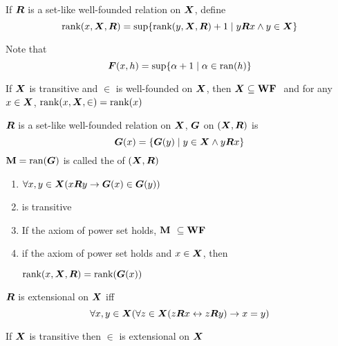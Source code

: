 \documentclass[11pt]{article}
\begin{document}
\begin{definition}[]
If \(\boldsymbol{R}\) is a set-like well-founded relation on \(\boldsymbol{X}\), define 
\begin{equation*}
\text{rank}(x,\boldsymbol{X},\boldsymbol{R})=\sup\{\text{rank}(y,\boldsymbol{X},\boldsymbol{R})+1\mid y\boldsymbol{R} x\wedge y\in\boldsymbol{X}\}
\end{equation*}
\end{definition}

Note that
\begin{equation*}
\boldsymbol{F}(x,h)=\sup\{\alpha+1\mid\alpha\in\mathrm{ran}{(h)}\}
\end{equation*}

\begin{lemma}[$\zfmm$]
If \(\boldsymbol{X}\) is transitive and \(\in\) is well-founded on \(\boldsymbol{X}\), then
\(\boldsymbol{X}\subseteq\textbf{WF }\) and for any \(x\in\boldsymbol{X}\), \(\text{rank}(x,\boldsymbol{X},\in)=\text{rank}(x)\)
\end{lemma}

\begin{definition}[]
\(\boldsymbol{R}\) is a set-like well-founded relation on \(\boldsymbol{X}\), 
\(\boldsymbol{G}\) on \((\boldsymbol{X},\boldsymbol{R})\) is 
\begin{equation*}
\boldsymbol{G}(x)=\{\boldsymbol{G}(y)\mid y\in\boldsymbol{X}\wedge y\boldsymbol{R} x\}
\end{equation*}
\(\textbf{M}=\mathrm{ran}{(\boldsymbol{G})}\) is called the  of \((\boldsymbol{X},\boldsymbol{R})\)
\end{definition}

\begin{lemma}[]
\begin{enumerate}
\item \(\forall x,y\in\boldsymbol{X}(x\boldsymbol{R} y\to\boldsymbol{G}(x)\in\boldsymbol{G}(y))\)
\item \cm is transitive
\item If the axiom of power set holds, \(\textbf{M }\subseteq\textbf{WF }\)
\item if the axiom of power set holds and \(x\in\boldsymbol{X}\), then\par
\(\text{rank}(x,\boldsymbol{X},\boldsymbol{R})=\text{rank}(\boldsymbol{G}(x))\)
\end{enumerate}
\end{lemma}

\begin{definition}[]
\(\boldsymbol{R}\) is extensional on \(\boldsymbol{X}\) iff
\begin{equation*}
\forall x,y\in\boldsymbol{X}(\forall z\in\boldsymbol{X}(z\boldsymbol{R} x\leftrightarrow z\boldsymbol{R} y)\to x=y)
\end{equation*}
\end{definition}

\begin{lemma}[]
If \(\boldsymbol{X}\) is transitive then \(\in\) is extensional on \(\boldsymbol{X}\)
\end{lemma}
\end{document}
